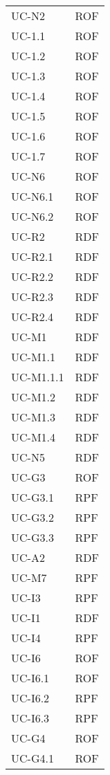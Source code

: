\begin{longtable}{| p{5cm} | p{5cm} |}
		UC-N2& ROF  \\
		\rowcolor{LightGray}
		UC-1.1 & ROF \\
		UC-1.2 & ROF \\
		\rowcolor{LightGray}
		UC-1.3 & ROF \\
		UC-1.4 & ROF \\
		\rowcolor{LightGray}
		UC-1.5 & ROF \\
		UC-1.6 & ROF \\
		\rowcolor{LightGray}
		UC-1.7 & ROF \\		
		UC-N6 & ROF \\
		\rowcolor{LightGray}
		UC-N6.1 & ROF \\
		UC-N6.2 & ROF \\
		\rowcolor{LightGray}
		UC-R2 & RDF \\
		UC-R2.1 & RDF \\
		\rowcolor{LightGray}
		UC-R2.2 & RDF \\
		UC-R2.3 & RDF \\
		\rowcolor{LightGray}
		UC-R2.4 & RDF \\
		UC-M1 & RDF \\
		\rowcolor{LightGray}
		UC-M1.1 & RDF\\
		UC-M1.1.1 & RDF\\
		UC-M1.2 & RDF\\
		UC-M1.3 & RDF\\
		UC-M1.4 & RDF\\
		\rowcolor{LightGray}
		UC-N5 & RDF \\
		UC-G3 & ROF \\
		\rowcolor{LightGray}
		UC-G3.1 & RPF \\
		\rowcolor{LightGray}
		UC-G3.2 & RPF \\
		UC-G3.3 & RPF \\
		\rowcolor{LightGray}
		UC-A2 & RDF \\
		UC-M7 & RPF \\
		\rowcolor{LightGray}
		UC-I3 & RPF \\
		UC-I1 & RDF \\
		\rowcolor{LightGray}
		UC-I4 & RPF \\
		UC-I6 & ROF \\
		\rowcolor{LightGray}
		UC-I6.1 & ROF \\
		UC-I6.2 & RPF \\
		\rowcolor{LightGray}
		UC-I6.3 & RPF \\
		UC-G4 & ROF \\
		\rowcolor{LightGray}
		UC-G4.1 & ROF \\

\end{longtable}
